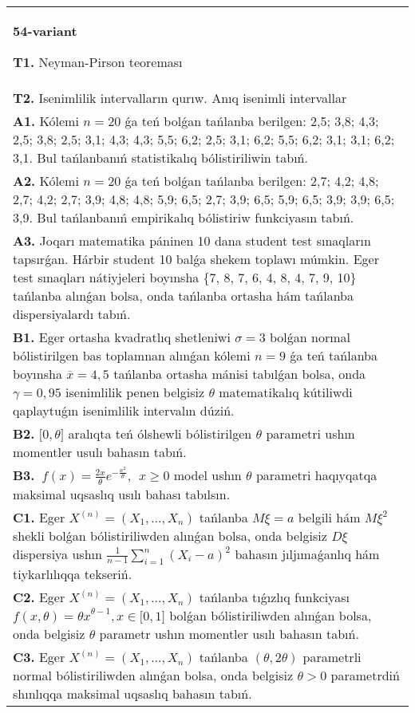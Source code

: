 \documentclass{article}
\begin{document}
\begin{tabular}{m{17cm}}
\textbf{54-variant}
\newline

\textbf{T1.} 
Neyman-Pirson teoreması
 \\
\textbf{T2.} 
Isenimlilik intervalların qurıw. Anıq isenimli intervallar
 \\
\textbf{A1.} 
Kólemi \(n = 20\) ǵa teń bolǵan tańlanba berilgen: 2,5; 3,8; 4,3; 2,5; 3,8; 2,5; 3,1; 4,3; 4,3; 5,5; 6,2; 2,5; 3,1; 6,2; 5,5; 6,2; 3,1; 3,1; 6,2; 3,1. Bul tańlanbanıń statistikalıq bólistiriliwin tabıń.
 \\
\textbf{A2.} 
Kólemi \(n = 20\) ǵa teń bolǵan tańlanba berilgen: 2,7; 4,2; 4,8; 2,7; 4,2; 2,7; 3,9; 4,8; 4,8; 5,9; 6,5; 2,7; 3,9; 6,5; 5,9; 6,5; 3,9; 3,9; 6,5; 3,9. Bul tańlanbanıń empirikalıq bólistiriw funkciyasın tabıń.
 \\
\textbf{A3.} 
Joqarı matematika páninen 10 dana student test sınaqların tapsırǵan. Hárbir student 10 balǵa shekem toplawı múmkin. Eger test sınaqları nátiyjeleri boyınsha \{7, 8, 7, 6, 4, 8, 4, 7, 9, 10\} tańlanba alınǵan bolsa, onda tańlanba ortasha hám tańlanba dispersiyalardı tabıń.
 \\
\textbf{B1.} 
Eger ortasha kvadratlıq shetleniwi \(\sigma = 3\) bolǵan normal bólistirilgen bas toplamnan alınǵan kólemi \(n = 9\) ǵa teń tańlanba boyınsha \(\overline{x} = 4,5\) tańlanba ortasha mánisi tabılǵan bolsa, onda \(\gamma = 0,95\) isenimlilik penen belgisiz \(\theta\) matematikalıq kútiliwdi qaplaytuǵın isenimlilik intervalın dúziń.
 \\
\textbf{B2.} 
\(\lbrack 0,\theta\rbrack\) aralıqta teń ólshewli bólistirilgen \(\theta\) parametri ushın momentler usulı bahasın tabıń.
 \\
\textbf{B3.} 
\(\ f(x) = \frac{2x}{\theta}e^{- \frac{x^{2}}{\theta}},\ \ x \geq 0\) model ushın \(\theta\) parametri haqıyqatqa maksimal uqsaslıq usılı bahası tabılsın.
 \\
\textbf{C1.} 
Eger \(X^{(n)} = \left( X_{1},...,X_{n} \right)\) tańlanba \(M\xi = a\) belgili hám \(M\xi^{2}\) shekli bolǵan bólistiriliwden alınǵan bolsa, onda belgisiz \(D\xi\) dispersiya ushın \(\frac{1}{n - 1}\sum_{i = 1}^{n}\left( X_{i} - a \right)^{2}\) bahasın jıljımaǵanlıq hám tiykarlılıqqa tekseriń.
 \\
\textbf{C2.} 
Eger \(X^{(n)} = \left( X_{1},...,X_{n} \right)\) tańlanba tıǵızlıq funkciyası
${f(x,\theta) = \theta x}^{\theta - 1},x \in \lbrack 0,1\rbrack$
bolǵan bólistiriliwden alınǵan bolsa, onda belgisiz \(\theta\) parametr ushın momentler usılı bahasın tabıń.
 \\
\textbf{C3.} 
Eger \(X^{(n)} = \left( X_{1},...,X_{n} \right)\) tańlanba \((\theta,2\theta)\) parametrli normal bólistiriliwden alınǵan bolsa, onda belgisiz \(\theta > 0\) parametrdiń shınlıqqa maksimal uqsaslıq bahasın tabıń.
 \\

\end{tabular}
\vspace{1cm}
\end{document}
